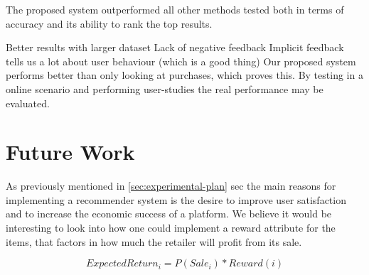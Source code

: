 The proposed system outperformed all other methods tested both in terms of
accuracy and its ability to rank the top results.


Better results with larger dataset
Lack of negative feedback
Implicit feedback tells us a lot about user behaviour (which is a good thing)
Our proposed system performs better than only looking at purchases, which
proves this.
By testing in a online scenario and performing user-studies the real
performance may be evaluated.



%


\clearpage
\section{Future Work}

As previously mentioned in \ref{sec:experimental-plan} sec the main reasons for
implementing a recommender system is the desire to improve user satisfaction
and to increase the economic success of a platform.  We believe it would be
interesting to look into how one could implement a reward attribute for the
items, that factors in how much the retailer will profit from its sale.

\begin{equation}
ExpectedReturn_i = P(Sale_i) * Reward(i)
\end{equation}

